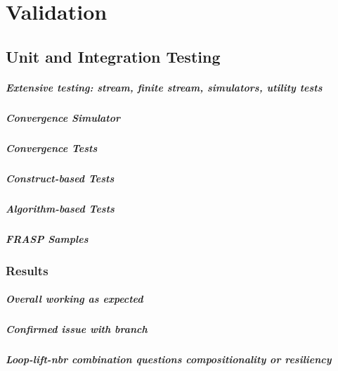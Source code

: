 
\chapter{Validation}
\label{chapter:validation}

\section{Unit and Integration Testing}
\paragraph{Extensive testing: stream, finite stream, simulators, utility tests}
\paragraph{Convergence Simulator}
\paragraph{Convergence Tests}
\paragraph{Construct-based Tests}
\paragraph{Algorithm-based Tests}
\paragraph{FRASP Samples}

\subsection{Results}
\paragraph{Overall working as expected}
\paragraph{Confirmed issue with branch}
\paragraph{Loop-lift-nbr combination questions compositionality or resiliency}